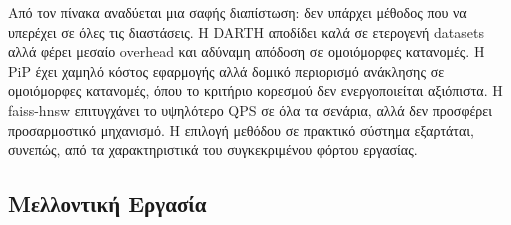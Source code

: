 \documentclass[12pt,a4paper]{article}
\begin{document}
\begin{table}[H]
\centering
\caption{Ποιοτική σύγκριση μεθόδων}
\label{tab:method_summary}
\end{table}

Από τον πίνακα αναδύεται μια σαφής διαπίστωση: δεν υπάρχει μέθοδος που να υπερέχει σε όλες τις διαστάσεις. Η DARTH αποδίδει καλά σε ετερογενή datasets αλλά φέρει μεσαίο overhead και αδύναμη απόδοση σε ομοιόμορφες κατανομές. Η PiP έχει χαμηλό κόστος εφαρμογής αλλά δομικό περιορισμό ανάκλησης σε ομοιόμορφες κατανομές, όπου το κριτήριο κορεσμού δεν ενεργοποιείται αξιόπιστα. Η faiss-hnsw επιτυγχάνει το υψηλότερο QPS σε όλα τα σενάρια, αλλά δεν προσφέρει προσαρμοστικό μηχανισμό. Η επιλογή μεθόδου σε πρακτικό σύστημα εξαρτάται, συνεπώς, από τα χαρακτηριστικά του συγκεκριμένου φόρτου εργασίας.

\subsection{Μελλοντική Εργασία}
\end{document}
